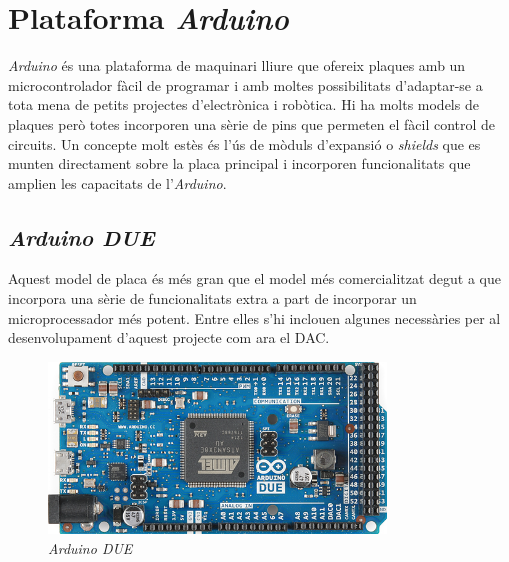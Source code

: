 \section{Plataforma \textit{Arduino}}\label{sec:plataforma_arduino}

\textit{Arduino} és una plataforma de maquinari lliure que ofereix plaques amb un microcontrolador fàcil de programar i amb moltes possibilitats d'adaptar-se a tota mena de petits projectes d'electrònica i robòtica.  Hi ha molts models de plaques però totes incorporen una sèrie de pins que permeten el fàcil control de circuits. Un concepte molt estès és l'ús de mòduls d'expansió o \textit{shields} que es munten directament sobre la placa principal i incorporen funcionalitats que amplien les capacitats de l'\textit{Arduino}.

\subsection{\textit{Arduino DUE}}\label{subsec:arduino}

Aquest model de placa és més gran que el model més comercialitzat degut a que incorpora una sèrie de funcionalitats extra a part de incorporar un microprocessador més potent. Entre elles s'hi inclouen algunes necessàries per al desenvolupament d'aquest projecte com ara el \acs{DAC}.

\begin{figure}[htp]
\centering
\includegraphics[width=0.8\textwidth]{Figures/arduino_due.png}
\caption[Arduino DUE]{\textit{Arduino DUE}}
\label{fig:arduino_due}
\end{figure}
